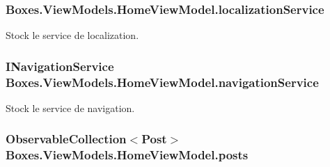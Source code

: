 \subsubsection[{\texorpdfstring{localization\+Service}{localizationService}}]{ Boxes.\+View\+Models.\+Home\+View\+Model.\+localization\+Service\hspace{0.3cm}{\ttfamily [private]}}\hypertarget{class_boxes_1_1_view_models_1_1_home_view_model_a929f17c774ad92cff26b39e3f35812c6}{}\label{class_boxes_1_1_view_models_1_1_home_view_model_a929f17c774ad92cff26b39e3f35812c6}


Stock le service de localization. 

\subsubsection[{\texorpdfstring{navigation\+Service}{navigationService}}]{\setlength{\rightskip}{0pt plus 5cm}I\+Navigation\+Service Boxes.\+View\+Models.\+Home\+View\+Model.\+navigation\+Service\hspace{0.3cm}{\ttfamily [private]}}\hypertarget{class_boxes_1_1_view_models_1_1_home_view_model_ae5517d2f2f0bf741514a370425c99fcb}{}\label{class_boxes_1_1_view_models_1_1_home_view_model_ae5517d2f2f0bf741514a370425c99fcb}


Stock le service de navigation. 

\subsubsection[{\texorpdfstring{posts}{posts}}]{\setlength{\rightskip}{0pt plus 5cm}Observable\+Collection$<${\bf Post}$>$ Boxes.\+View\+Models.\+Home\+View\+Model.\+posts\hspace{0.3cm}{\ttfamily [private]}}\hypertarget{class_boxes_1_1_view_models_1_1_home_view_model_a5bdecd39df858e8a9b57d5d3f6210a44}{}\label{class_boxes_1_1_view_models_1_1_home_view_model_a5bdecd39df858e8a9b57d5d3f6210a44}



